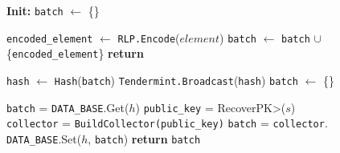 \begin{figure}[t!]
  \begin{adjustbox}{minipage=[t]{\columnwidth}}
    \begin{algorithm}[H]
      \renewcommand{\thealgorithm}{Hash Collector}         
      \caption{}%
      \label{alg:collector-hash}%
      \small
      \begin{algorithmic}[1]
            \State \textbf{Init:} \texttt{batch} $\leftarrow$ \{\}
      
            \label{alg:hash_add_tx}
            			\State \texttt{encoded\_element} $\leftarrow$ \texttt{RLP.Encode}($element$)
					        \State \texttt{batch} $\leftarrow$ \texttt{batch} $\cup$ \{\texttt{encoded\_element}\}
                \EndIf
                \State \textbf{return}
            \EndFunction

            \smallskip

              \State \texttt{hash} $\leftarrow$  \texttt{Hash}(\texttt{batch})
              \State \texttt{Tendermint.Broadcast}(\texttt{hash})
              \State \texttt{batch} $\leftarrow$ \{\}
            \EndWhen

            \label{alg:hash_request_tx}
                \State \texttt{batch} = \texttt{DATA\_BASE}.Get($h$)
              \Else
                \State \texttt{public\_key} = \<RecoverPK>($s$)
                \State \texttt{collector} = \texttt{BuildCollector(public\_key)}
                \State \texttt{batch} = \texttt{collector}.
                \State \texttt{DATA\_BASE}.Set($h$, \texttt{batch})
              \EndIf
              \State \textbf{return} \texttt{batch}
            \EndFunction
            
        \end{algorithmic}
      \end{algorithm}
	\end{adjustbox}
  \end{figure}
